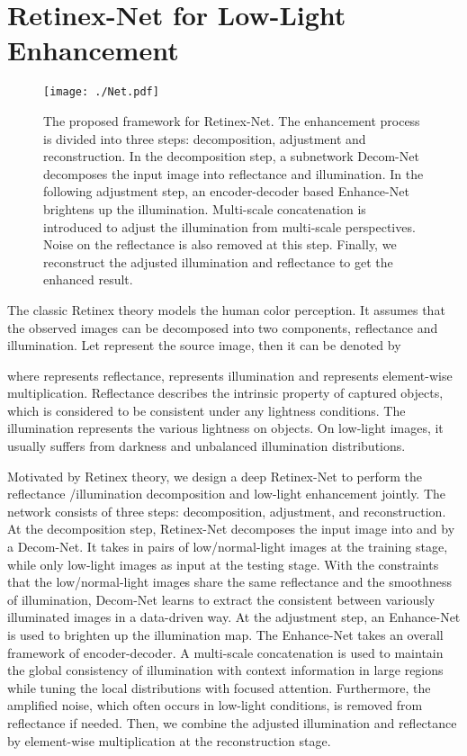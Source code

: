 \documentclass{bmvc2k}
\begin{document}
\section{Retinex-Net for Low-Light Enhancement}
\begin{figure}[t]
	\centering
	\begin{minipage}[t]{\linewidth}
		\centering
		\texttt{[image: ./Net.pdf]}
		\end{minipage}
    \vspace{-0.6 cm}
	\caption{The proposed framework for Retinex-Net. The enhancement process is divided into three steps: decomposition, adjustment and reconstruction. In the decomposition step, a subnetwork Decom-Net decomposes the input image into reflectance and illumination. In the following adjustment step, an encoder-decoder based Enhance-Net brightens up the illumination. Multi-scale concatenation is introduced to adjust the illumination from multi-scale perspectives. Noise on the reflectance is also removed at this step. Finally, we reconstruct the adjusted illumination and reflectance to get the enhanced result.}
	\label{fig:net}
	\end{figure}

The classic Retinex theory models the human color perception. It assumes that the observed images can be decomposed into two components, reflectance and illumination. Let  represent the source image, then it can be denoted by

where  represents reflectance,  represents illumination and  represents element-wise multiplication. Reflectance describes the intrinsic property of captured objects, which is considered to be consistent under any lightness conditions. The illumination represents the various lightness on objects. On low-light images, it usually suffers from darkness and unbalanced illumination distributions.

Motivated by Retinex theory, we design a deep Retinex-Net to perform the reflectance /illumination decomposition and low-light enhancement jointly. The network consists of three steps: decomposition, adjustment, and reconstruction. At the decomposition step, Retinex-Net decomposes the input image into  and  by a Decom-Net. It takes in pairs of low/normal-light images at the training stage, while only low-light images as input at the testing stage. With the constraints that the low/normal-light images share the same reflectance and the smoothness of illumination, Decom-Net learns to extract the consistent  between variously illuminated images in a data-driven way. At the adjustment step, an Enhance-Net is used to brighten up the illumination map. The Enhance-Net takes an overall framework of encoder-decoder. A multi-scale concatenation is used to maintain the global consistency of illumination with context information in large regions while tuning the local distributions with focused attention. Furthermore, the amplified noise, which often occurs in low-light conditions, is removed from reflectance if needed. Then, we combine the adjusted illumination and reflectance by element-wise multiplication at the reconstruction stage.
\end{document}
